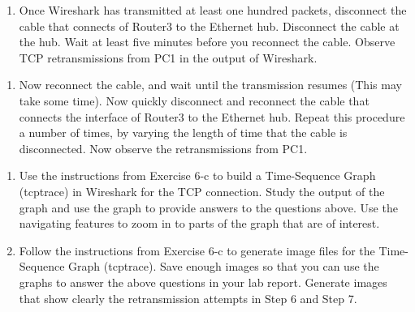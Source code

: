 \begin{enumerate}[resume]
	\item Once Wireshark has transmitted at least one hundred packets, disconnect the cable that connects  of Router3 to the Ethernet hub. Disconnect the cable at the hub. Wait at least five minutes before you reconnect the cable. Observe TCP retransmissions from PC1 in the output of Wireshark.
\end{enumerate}

\begin{questions}
\end{questions}

\begin{enumerate}[resume]
	\item Now reconnect the cable, and wait until the transmission resumes (This may take some time). Now quickly disconnect and reconnect the cable that connects the interface  of Router3 to the Ethernet hub. Repeat this procedure a number of times, by varying the length of time that the cable is disconnected. Now observe the retransmissions from PC1.
\end{enumerate}

\begin{questions}
\end{questions}

\begin{enumerate}[resume]
	\item Use the instructions from Exercise 6-c to build a Time-Sequence Graph (tcptrace) in Wireshark for the TCP connection. Study the output of the graph and use the graph to provide answers to the questions above. Use the navigating features to zoom in to parts of the graph that are of interest.
	\item Follow the instructions from Exercise 6-c to generate image files for the Time- Sequence Graph (tcptrace). Save enough images so that you can use the graphs to answer the above questions in your lab report. Generate images that show clearly the retransmission attempts in Step 6 and Step 7.
\end{enumerate}

